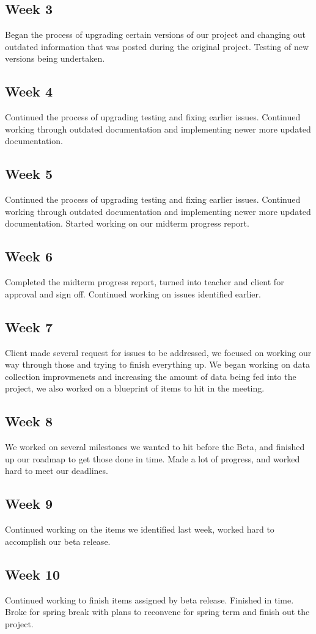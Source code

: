 \documentclass{article}
\begin{document}
\subsection{Week 3}
Began the process of upgrading certain versions of our project and changing out outdated information that was posted during the original project. Testing of new versions being undertaken.
\subsection{Week 4}
Continued the process of upgrading testing and fixing earlier issues. Continued working through outdated documentation and implementing newer more updated documentation. 
\subsection{Week 5}
Continued the process of upgrading testing and fixing earlier issues. Continued working through outdated documentation and implementing newer more updated documentation. Started working on our midterm progress report.
\subsection{Week 6}
Completed the midterm progress report, turned into teacher and client for approval and sign off. Continued working on issues identified earlier. 
\subsection{Week 7}
Client made several request for issues to be addressed, we focused on working our way through those and trying to finish everything up. We began working on data collection improvmenets and increasing the amount of data being fed into the project, we also worked on a blueprint of items to hit in the meeting.
\subsection{Week 8}
We worked on several milestones we wanted to hit before the Beta, and finished up our roadmap to get those done in time. Made a lot of progress, and worked hard to meet our deadlines.
\subsection{Week 9}
Continued working on the items we identified last week, worked hard to accomplish our beta release. 
\subsection{Week 10}
Continued working to finish items assigned by beta release. Finished in time. Broke for spring break with plans to reconvene for spring term and finish out the project.
\end{document}
